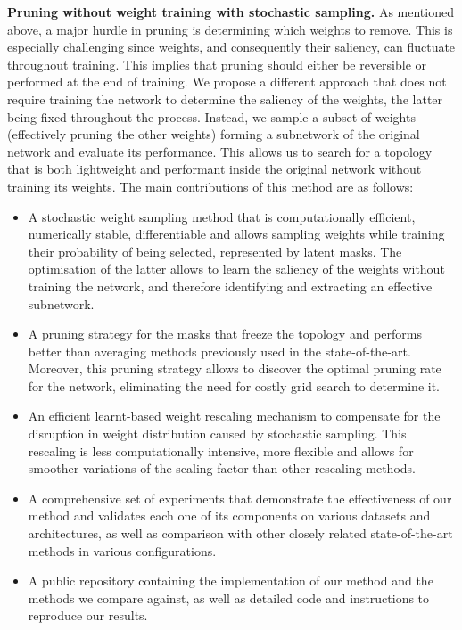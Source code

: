 \noindent \textbf{Pruning without weight training with stochastic sampling.} As
mentioned above, a major hurdle in pruning is determining which weights to
remove. This is especially challenging since weights, and consequently their
saliency, can fluctuate throughout training. This implies that pruning should
either be reversible or performed at the end of training. We propose a different
approach that does not require training the network to determine the saliency of
the weights, the latter being fixed throughout the process. Instead, we sample a
subset of weights (effectively pruning the other weights) forming a subnetwork
of the original network and evaluate its performance. This allows us to search
for a topology that is both lightweight and performant inside the original
network without training its weights. The main contributions of this method are
as follows: \\

\begin{itemize}
      \item A stochastic weight sampling method that is computationally
            efficient, numerically stable, differentiable and allows sampling
            weights while training their probability of being selected,
            represented by latent masks. The optimisation of the latter allows
            to learn the saliency of the weights without training the network,
            and therefore identifying and extracting an effective subnetwork.

      \item A pruning strategy for the masks that freeze the topology and
            performs better than averaging methods previously used in the
            state-of-the-art. Moreover, this pruning strategy allows to discover
            the optimal pruning rate for the network, eliminating the need for
            costly grid search to determine it.

      \item An efficient learnt-based weight rescaling mechanism to compensate
            for the disruption in weight distribution caused by stochastic
            sampling. This rescaling is less computationally intensive, more
            flexible and allows for smoother variations of the scaling factor
            than other rescaling methods.

      \item A comprehensive set of experiments that demonstrate the
            effectiveness of our method and validates each one of its components
            on various datasets and architectures, as well as comparison with
            other closely related state-of-the-art methods in various
            configurations.

      \item A public repository containing the implementation of our method and
            the methods we compare against, as well as detailed code and instructions to
            reproduce our results.\\
\end{itemize}


